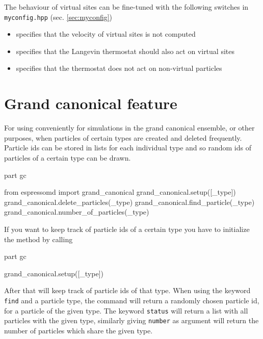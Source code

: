 The behaviour of virtual sites can be fine-tuned with the following
switches in \texttt{myconfig.hpp} (sec. \ref{sec:myconfig})
\begin{itemize}
\item {} specifies that the velocity
  of virtual sites is not computed
\item {} specifies that the Langevin
  thermostat should also act on virtual sites
\item {} specifies that the
  thermostat does not act on non-virtual particles
\end{itemize}

\section{Grand canonical feature}
For using \es conveniently for simulations in the grand canonical ensemble, or
other purposes, when particles of certain types are created and deleted frequently.
Particle ids can be stored in lists for each individual type and so random ids of
particles of a certain type can be drawn. 

\begin{essyntax}
part gc
\end{essyntax}
\begin{pypresso}
from espressomd import grand_canonical
grand_canonical.setup([_type])
grand_canonical.delete_particles(_type)
grand_canonical.find_particle(_type)
grand_canonical.number_of_particles(_type)
\end{pypresso}

If you want \es to keep track of particle ids of a certain type you have to
initialize the method by calling 
\begin{essyntax}
	part gc 
\end{essyntax}
\begin{pypresso}
grand_canonical.setup([_type])
\end{pypresso}
After that \es will keep track of particle ids of that type. 
When using the keyword \texttt{find} and a particle type, the
command will return a randomly chosen particle id, for a particle of
the given type. 
The keyword \texttt{status} will return a list with all particles with the given
type, similarly giving \texttt{number} as argument will return the number of
particles which share the given type.

